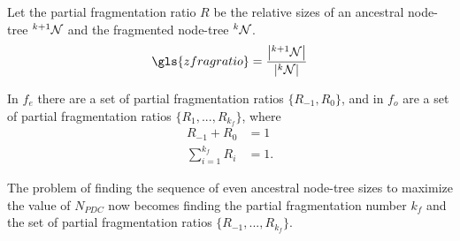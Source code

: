 \begin{definition}\label{lem:fragratio}
  Let the partial fragmentation ratio $R$ be the relative sizes of an ancestral node-tree ${}^{k+1}\mathcal{N}$ and the fragmented node-tree ${}^{k}\mathcal{N}$.
  \begin{equation}\label{eq:fragratio}
    \gls{zfragratio} = \frac{\abs{\pre{k+1}\nset}}{\abs{\pre{k}\nset}}
  \end{equation}
\end{definition}
In $f_e$ there are a set of partial fragmentation ratios $\{R_{-1}, R_0\}$, and in $f_o$ are a set of partial fragmentation ratios $\{R_1,...,R_{k_f}\}$, where
\begin{align}
  R_{-1} +  R_0 &= 1 \\
 \sum_{i=1}^{k_f}{R_i} &= 1. 
\end{align}

The problem of finding the sequence of even ancestral node-tree sizes to maximize the value of $N_{PDC}$ now becomes finding the partial fragmentation number $k_f$ and the set of partial fragmentation ratios $\{R_{-1},..., R_{k_f}\}$.  

